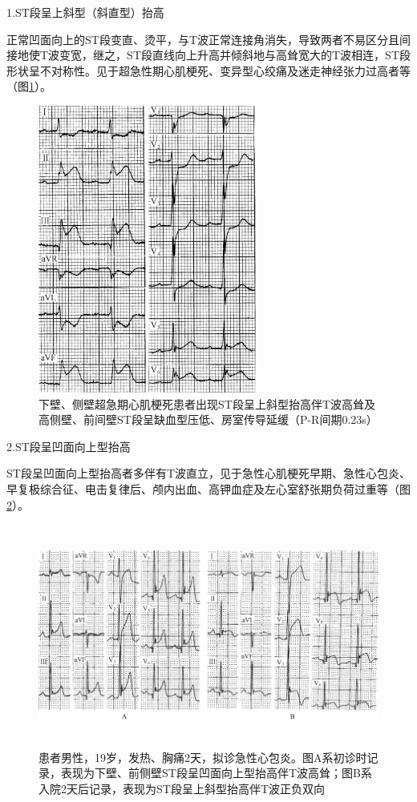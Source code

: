1.ST段呈上斜型（斜直型）抬高

正常凹面向上的ST段变直、烫平，与T波正常连接角消失，导致两者不易区分且间接地使T波变宽，继之，ST段直线向上升高并倾斜地与高耸宽大的T波相连，ST段形状呈不对称性。见于超急性期心肌梗死、变异型心绞痛及迷走神经张力过高者等（图\ref{fig5-1}）。

\begin{figure}[!htbp]
 \centering
 \includegraphics[width=2.82292in,height=3.72917in]{./images/Image00082.jpg}
 \captionsetup{justification=centering}
 \caption{下壁、侧壁超急期心肌梗死患者出现ST段呈上斜型抬高伴T波高耸及高侧壁、前间壁ST段呈缺血型压低、房室传导延缓（P-R间期0.23s）}
 \label{fig5-1}
  \end{figure} 

2.ST段呈凹面向上型抬高

ST段呈凹面向上型抬高者多伴有T波直立，见于急性心肌梗死早期、急性心包炎、早复极综合征、电击复律后、颅内出血、高钾血症及左心室舒张期负荷过重等（图\ref{fig5-2}）。

\begin{figure}[!htbp]
 \centering
 \includegraphics[width=5.78125in,height=2.88542in]{./images/Image00083.jpg}
 \captionsetup{justification=centering}
 \caption{患者男性，19岁，发热、胸痛2天，拟诊急性心包炎。图A系初诊时记录，表现为下壁、前侧壁ST段呈凹面向上型抬高伴T波高耸；图B系入院2天后记录，表现为ST段呈上斜型抬高伴T波正负双向}
 \label{fig5-2}
  \end{figure} 

